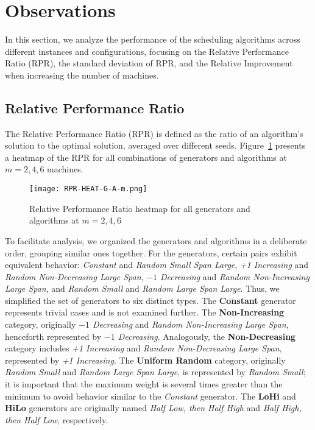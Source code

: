 \section{Observations}

In this section, we analyze the performance of the scheduling algorithms across different instances and configurations, focusing on the Relative Performance Ratio (RPR), the standard deviation of RPR, and the Relative Improvement when increasing the number of machines.

\subsection{Relative Performance Ratio}

The Relative Performance Ratio (RPR) is defined as the ratio of an algorithm's solution to the optimal solution, averaged over different seeds. Figure~\ref{fig:RPR-HEAT-G-A-m} presents a heatmap of the RPR for all combinations of generators and algorithms at $m = 2, 4, 6$ machines.

\begin{figure}
    \centering
    \texttt{[image: RPR-HEAT-G-A-m.png]}
    \caption{Relative Performance Ratio heatmap for all generators and algorithms at $m = 2, 4, 6$}
    \label{fig:RPR-HEAT-G-A-m}
\end{figure}

To facilitate analysis, we organized the generators and algorithms in a deliberate order, grouping similar ones together. For the generators, certain pairs exhibit equivalent behavior: \textit{Constant} and \textit{Random Small Span Large}, \textit{+1 Increasing} and \textit{Random Non-Decreasing Large Span}, \textit{$-1$ Decreasing} and \textit{Random Non-Increasing Large Span}, and \textit{Random Small} and \textit{Random Large Span Large}. Thus, we simplified the set of generators to six distinct types. The \textbf{Constant} generator represents trivial cases and is not examined further. The \textbf{Non-Increasing} category, originally \textit{$-1$ Decreasing} and \textit{Random Non-Increasing Large Span}, henceforth represented by \textit{$-1$ Decreasing}. Analogously, the \textbf{Non-Decreasing} category includes \textit{+1 Increasing} and \textit{Random Non-Decreasing Large Span}, represented by \textit{+1 Increasing}. The \textbf{Uniform Random} category, originally \textit{Random Small} and \textit{Random Large Span Large}, is represented by \textit{Random Small}; it is important that the maximum weight is several times greater than the minimum to avoid behavior similar to the \textit{Constant} generator. The \textbf{LoHi} and \textbf{HiLo} generators are originally named \textit{Half Low, then Half High} and \textit{Half High, then Half Low}, respectively.

